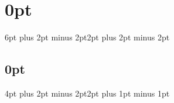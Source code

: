 
\setlength{\floatsep}{4mm}
\setlength{\textfloatsep}{2mm}

\setlength{\intextsep}{0.5mm}
\setlength{\abovecaptionskip}{2mm}
\setlength{\belowcaptionskip}{0mm}

\renewcommand{\topfraction}{0.9}
\renewcommand{\textfraction}{0.1}
\renewcommand{\floatpagefraction}{1}

\usepackage[small,compact,noindentafter]{titlesec} 
\usepackage[compact]{titlesec}

\titlespacing\section{0pt}{6pt plus 2pt minus 2pt}{2pt plus 2pt minus 2pt}
\titlespacing\subsection{0pt}{4pt plus 2pt minus 2pt}{2pt plus 1pt minus 1pt}

\usepackage[inline]{enumitem}

\usepackage[subtle,margins=normal]{savetrees}

\usepackage{setspace}
\usepackage[margin=5pt,font={stretch=0.9}]{caption}
